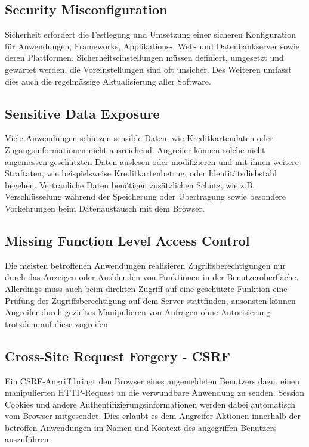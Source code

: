 \subsection{Security Misconfiguration}
Sicherheit erfordert die Festlegung und Umsetzung einer sicheren Konfiguration für Anwendungen, Frameworks, Applikations-, Web- und Datenbankserver sowie deren Plattformen. Sicherheitseinstellungen müssen definiert, umgesetzt und gewartet werden, die Voreinstellungen sind oft unsicher. Des Weiteren umfasst dies auch die regelmässige Aktualisierung aller Software.

\subsection{Sensitive Data Exposure}
Viele Anwendungen schützen sensible Daten, wie Kreditkartendaten oder Zugangsinformationen nicht ausreichend. Angreifer können solche nicht angemessen geschützten Daten auslesen oder modifizieren und mit ihnen weitere Straftaten, wie beispielsweise Kreditkartenbetrug, oder Identitätsdiebstahl begehen. Vertrauliche Daten benötigen zusätzlichen Schutz, wie z.B. Verschlüsselung während der Speicherung oder Übertragung sowie besondere Vorkehrungen beim Datenaustausch mit dem Browser.

\subsection{Missing Function Level Access Control}
Die meisten betroffenen Anwendungen realisieren Zugriffsberechtigungen nur durch das Anzeigen oder Ausblenden von Funktionen in der Benutzeroberfläche. Allerdings muss auch beim direkten Zugriff auf eine geschützte Funktion eine Prüfung der Zugriffsberechtigung auf dem Server stattfinden, ansonsten können Angreifer durch gezieltes Manipulieren von Anfragen ohne Autorisierung trotzdem auf diese zugreifen.

\subsection{Cross-Site Request Forgery - CSRF}
Ein CSRF-Angriff bringt den Browser eines angemeldeten Benutzers dazu, einen manipulierten HTTP-Request an die verwundbare Anwendung zu senden. Session Cookies und andere Authentifizierungsinformationen werden dabei automatisch vom Browser mitgesendet. Dies erlaubt es dem Angreifer Aktionen innerhalb der betroffen Anwendungen im Namen und Kontext des angegriffen Benutzers auszuführen.

